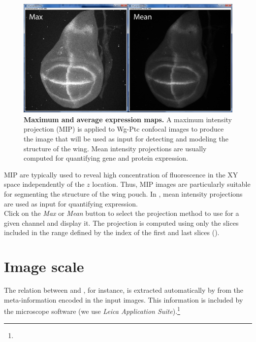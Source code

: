 \begin{figure}[!h]
\centering
\includegraphics[scale=0.26]{images/projection_mean_max.jpg}
\caption{\textbf{Maximum and average expression maps.} A maximum intensity projection (MIP) is applied to Wg-Ptc confocal images to produce the image that will be used as input for detecting and modeling the structure of the \droso wing. Mean intensity projections are usually computed for quantifying gene and protein expression.}
\label{fig:projection_mean_max}
\end{figure}

MIP are typically used to reveal high concentration of fluorescence in the XY space independently of the $z$ location. Thus, MIP images are particularly suitable for segmenting the structure of the \droso wing pouch. In \wingj, mean intensity projections are used as input for quantifying expression.\\

Click on the \textit{Max} or \textit{Mean} button to select the projection method to use for a given channel and display it. The projection is computed using only the slices included in the range defined by the index of the first and last slices ().

\section{Image scale}\label{sec:structure_image_scale}
The relation between \px and \mum, for instance, is extracted automatically by \wingj from the meta-information encoded in the input images. This information is included by the microscope software (we use \textit{Leica Application Suite}).\footnote{\leicaWebsite}\\

